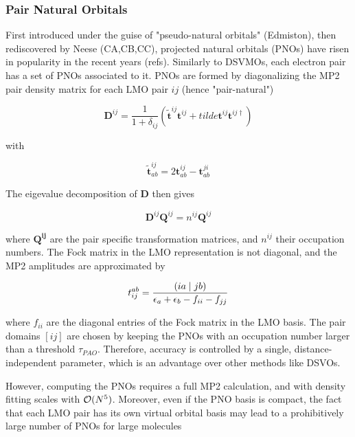 \subsubsection*{Pair Natural Orbitals}
First introduced under the guise of "pseudo-natural orbitals" (Edmiston), then rediscovered by Neese (CA,CB,CC), projected natural orbitals (PNOs) have risen in popularity in the recent years (refs). Similarly to DSVMOs, each electron pair has a set of PNOs associated to it. PNOs are formed by diagonalizing the MP2 pair density matrix for each LMO pair $ij$ (hence "pair-natural")

\begin{equation}
\mathbf{D}^{ij} = \frac{1}{1+\delta_{ij}} \left(\tilde{\mathbf{t}}^{ij} \mathbf{t}^{ij} + tilde{\mathbf{t}}^{ij} \mathbf{t}^{ij\dagger} \right)
\end{equation}

\noindent with 

\begin{equation}
\mathbf{\tilde{t}}^{ij}_{ab} = 2 \mathbf{t}^{ij}_{ab} - \mathbf{t}^{ji}_{ab} 
\end{equation}

\noindent The eigevalue decomposition of $\mathbf{D}$ then gives

\begin{equation}
\mathbf{D}^{ij} \mathbf{Q}^{ij} = n^{ij} \mathbf{Q}^{ij} 
\end{equation}

\noindent where $\mathbf{Q^{ij}}$ are the pair specific transformation matrices, and $n^{ij}$ their occupation numbers. The Fock matrix in the LMO representation is not diagonal, and the MP2 amplitudes are approximated by

\begin{equation}
t_{ij}^{ab} = \frac{\left( ia \mid jb \right)}{\epsilon_a + \epsilon_b - f_{ii} - f_{jj}}
\end{equation}

\noindent where $f_{ii}$ are the diagonal entries of the Fock matrix in the LMO basis. The pair domains $[ij]$ are chosen by keeping the PNOs with an occupation number larger than a threshold $\tau_{PAO}$. Therefore, accuracy is controlled by a single, distance-independent parameter, which is an advantage over other methods like DSVOs. 

However, computing the PNOs requires a full MP2 calculation, and with density fitting scales with $\mathcal{O}(N^{5})$. Moreover, even if the PNO basis is compact, the fact that each LMO pair has its own virtual orbital basis may lead to a prohibitively large number of PNOs for large molecules 

